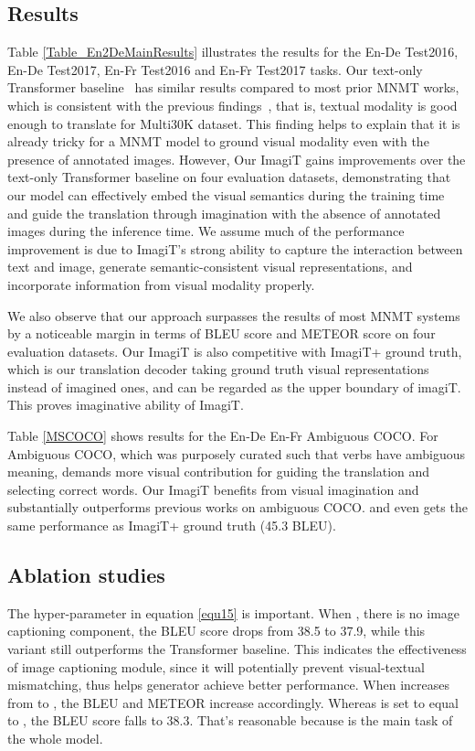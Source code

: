 \documentclass[11pt]{article}
\newcommand{\method}{ImagiT\xspace}
\begin{document}
\subsection{Results}

Table \ref{Table_En2DeMainResults} illustrates the results for the En-De Test2016, En-De Test2017, En-Fr Test2016 and En-Fr Test2017 tasks. Our text-only Transformer baseline~\cite{vaswani2017attention} has similar results compared to most prior MNMT works, which is consistent with the previous findings~\cite{caglayan2019probing}, that is, textual modality is good enough to translate for Multi30K dataset. This finding helps to explain that it is already tricky for a MNMT model to ground visual modality even with the presence of annotated images. However, Our \method gains improvements over the text-only Transformer baseline on four evaluation datasets, demonstrating that our model can effectively embed the visual semantics during the training time and guide the translation through imagination with the absence of annotated images during the inference time. We assume much of the performance improvement is due to \method's strong ability to capture the interaction between text and image, generate semantic-consistent visual representations, and incorporate information from visual modality properly. 

We also observe that our approach surpasses the results of most MNMT systems by a noticeable margin in terms of BLEU score and METEOR score on four evaluation datasets. Our \method is also competitive with \method + ground truth, which is our translation decoder taking ground truth visual representations instead of imagined ones, and can be regarded as the upper boundary of imagiT. This proves imaginative ability of \method.

Table \ref{MSCOCO} shows results for the En-De En-Fr Ambiguous COCO. For Ambiguous COCO, which was purposely curated such that verbs have ambiguous meaning, demands more visual contribution for guiding the translation and selecting correct words. Our \method benefits from visual imagination and substantially outperforms previous works on ambiguous COCO. and even gets the same performance as \method + ground truth (45.3 BLEU).

\subsection{Ablation studies}

The hyper-parameter  in equation \ref{equ15} is important. When , there is no image captioning component, the BLEU score drops from 38.5 to 37.9, while this variant still outperforms the Transformer baseline. This indicates the effectiveness of image captioning module, since it will potentially prevent visual-textual mismatching, thus helps generator achieve better performance. When  increases from  to , the BLEU and METEOR increase accordingly. Whereas  is set to equal to , the BLEU score falls to 38.3. That's reasonable because  is the main task of the whole model.
\end{document}
